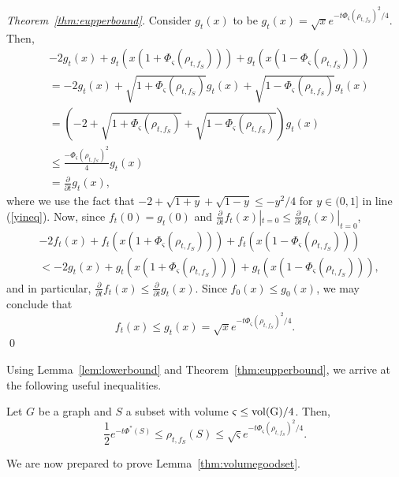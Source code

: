\documentclass[runningheads,a4paper]{llncs}
\newcommand{\localcheeg}{\Phi^*(S)}
\begin{document}
\begin{proof}[Theorem~\ref{thm:eupperbound}]
Consider $g_t(x)$ to be $g_t(x) = \sqrt{x}e^{-t\Phi_{\varsigma}(\rho_{t,f_S})^2/4}$.  Then,
\begin{align}
&-2g_t(x) + g_t(x(1+\Phi_{\varsigma}(\rho_{t,f_S}))) + g_t(x(1-\Phi_{\varsigma}(\rho_{t,f_S})))\nonumber\\
&= -2g_t(x) + \sqrt{1+\Phi_{\varsigma}(\rho_{t,f_S})}g_t(x) + \sqrt{1-\Phi_{\varsigma}(\rho_{t,f_S})}g_t(x)\nonumber\\
&= (-2 + \sqrt{1+\Phi_{\varsigma}(\rho_{t,f_S})} + \sqrt{1-\Phi_{\varsigma}(\rho_{t,f_S})})g_t(x)\nonumber\\
&\leq \frac{-\Phi_{\varsigma}(\rho_{t,f_S})^2}{4} g_t(x)\label{yineq}\\
&= \frac{\partial}{\partial t}g_t(x),\nonumber \end{align}
where we use the fact that $-2 + \sqrt{1+y} + \sqrt{1-y} \leq -y^2/4$ for
$y\in(0,1]$ in line (\ref{yineq}).  Now, since $f_t(0) = g_t(0)$ and
$\frac{\partial}{\partial t}f_t(x)|_{t=0} \leq \frac{\partial}{\partial
t}g_t(x)|_{t=0}$, \begin{align*}
&-2f_t(x) + f_t(x(1+\Phi_{\varsigma}(\rho_{t,f_S}))) + f_t(x(1-\Phi_{\varsigma}(\rho_{t,f_S})))\\
&< -2g_t(x) + g_t(x(1+\Phi_{\varsigma}(\rho_{t,f_S}))) + g_t(x(1-\Phi_{\varsigma}(\rho_{t,f_S}))),
\end{align*}
and in particular, $\frac{\partial}{\partial t}f_t(x) \leq
\frac{\partial}{\partial t}g_t(x)$.  Since $f_0(x) \leq g_0(x)$, we may conclude
that
\begin{equation*}
f_t(x) \leq g_t(x) = \sqrt{x}e^{-t\Phi_{\varsigma}(\rho_{t,f_S})^2/4}.
\end{equation*}
\qed\end{proof}

Using Lemma~\ref{lem:lowerbound} and Theorem~\ref{thm:eupperbound}, we arrive at
the following useful inequalities.

\begin{corollary}
\label{cor:bounds}
Let $G$ be a graph and $S$ a subset with volume $\varsigma \leq \rm{vol}(G)/4$.
Then,
\begin{equation*}
\frac{1}{2}e^{-t\localcheeg} 
\leq \rho_{t,f_S}(S)
\leq \sqrt{\varsigma}e^{-t\Phi_{\varsigma}(\rho_{t,f_S})^2/4}.
\end{equation*}
\end{corollary}

We are now prepared to prove Lemma~\ref{thm:volumegoodset}.
\end{document}
